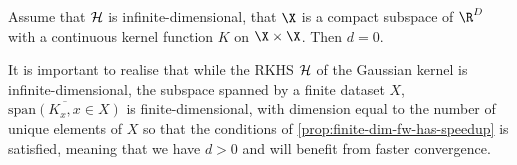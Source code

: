 \begin{proposition}
\label{prop:infinite-dim-fw-has-probably-not-speedup} Assume that \(\mathcal{H}\)
is infinite-dimensional, that \(\X\) is a compact subspace of \(\R^D\) with a
continuous kernel function \(K\) on \(\X \times \X\). Then \(d = 0\).
\end{proposition}

It is important to realise that while the RKHS \(\mathcal{H}\) of the Gaussian
kernel is infinite-dimensional, the subspace spanned by a finite dataset \(X\),
\(\overline{\textrm{span}(K_x, x \in X)}\) is finite-dimensional, with dimension
equal to the number of unique elements of \(X\) so that the conditions
of \ref{prop:finite-dim-fw-has-speedup} is satisfied, meaning that we have \(d >
0\) and will benefit from faster convergence.
